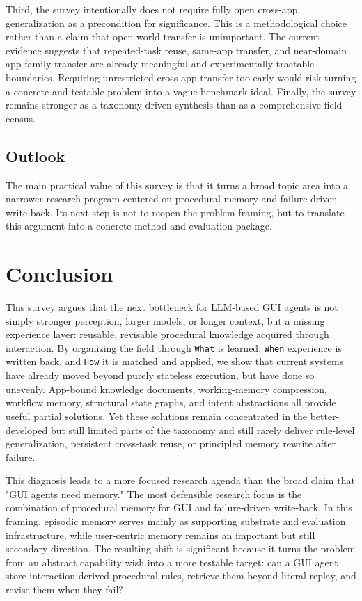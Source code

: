 \documentclass{article}
\begin{document}
Third, the survey intentionally does not require fully open cross-app
generalization as a precondition for significance. This is a
methodological choice rather than a claim that open-world transfer is
unimportant. The current evidence suggests that repeated-task reuse,
same-app transfer, and near-domain app-family transfer are already
meaningful and experimentally tractable boundaries. Requiring
unrestricted cross-app transfer too early would risk turning a concrete
and testable problem into a vague benchmark ideal. Finally, the survey
remains stronger as a taxonomy-driven synthesis than as a comprehensive
field census.

\subsection{Outlook}\label{93-outlook}

The main practical value of this survey is that it turns a broad topic
area into a narrower research program centered on procedural memory and
failure-driven write-back. Its next step is not to reopen the problem
framing, but to translate this argument into a concrete method and
evaluation package.

\section{Conclusion}\label{10-conclusion}

This survey argues that the next bottleneck for LLM-based GUI agents is
not simply stronger perception, larger models, or longer context, but a
missing experience layer: reusable, revisable procedural knowledge
acquired through interaction. By organizing the field through
\texttt{What} is learned, \texttt{When} experience is written back, and
\texttt{How} it is matched and applied, we show that current systems
have already moved beyond purely stateless execution, but have done so
unevenly. App-bound knowledge documents, working-memory compression,
workflow memory, structural state graphs, and intent abstractions all
provide useful partial solutions. Yet these solutions remain
concentrated in the better-developed but still limited parts of the
taxonomy and still rarely deliver rule-level generalization, persistent
cross-task reuse, or principled memory rewrite after failure.

This diagnosis leads to a more focused research agenda than the broad
claim that "GUI agents need memory." The most defensible research focus
is the combination of procedural memory for GUI and failure-driven
write-back. In this framing, episodic memory serves mainly as supporting
substrate and evaluation infrastructure, while user-centric memory
remains an important but still secondary direction. The resulting shift
is significant because it turns the problem from an abstract capability
wish into a more testable target: can a GUI agent store
interaction-derived procedural rules, retrieve them beyond literal
replay, and revise them when they fail?
\end{document}
